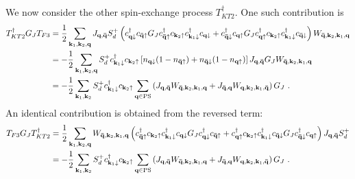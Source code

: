 \documentclass[reprint,hidelinks]{revtex4-2}
\begin{document}
\begin{widetext}
We now consider the other spin-exchange process \(T_{KT2}^\dagger\). One such contribution is
\begin{equation}\begin{aligned}\label{kondoRenorm3}
	T_{KT2}^\dagger G_J T_{F3} &= \frac{1}{2}\sum_{{\bf k}_1,{\bf k}_2,{\bf q}} J_{{\bf q}, {\bf \bar q}}S_d^+ \left(c^\dagger_{{\bf q}\downarrow}c_{{\bf \bar q}\uparrow} G_J c^\dagger_{{\bf \bar q} \uparrow} c_{{\bf k}_2 \uparrow} c^\dagger_{{\bf k}_1 \downarrow} c_{{\bf q} \downarrow} + c^\dagger_{{\bf \bar q}\downarrow}c_{{\bf q}\uparrow}  G_J  c^\dagger_{{\bf q} \uparrow} c_{{\bf k}_2 \uparrow} c^\dagger_{{\bf k}_1 \downarrow} c_{{\bf \bar q} \downarrow}\right)W_{{\bf \bar q}, {\bf k}_2, {\bf k}_1, {\bf q}}\\
							   &= -\frac{1}{2}\sum_{{\bf k}_1,{\bf k}_2,{\bf q}} S_d^+ c^\dagger_{{\bf k}_1 \downarrow} c_{{\bf k}_2 \uparrow}\left[n_{{\bf q}\downarrow}(1 - n_{{\bf \bar q}\uparrow}) + n_{{\bf \bar q}\downarrow}(1 - n_{{\bf q}\uparrow}) \right] J_{{\bf q}, {\bf \bar q}} G_J W_{{\bf \bar q}, {\bf k}_2, {\bf k}_1, {\bf q}}\\
							   &= -\frac{1}{2}\sum_{{\bf k}_1,{\bf k}_2} S_d^+ c^\dagger_{{\bf k}_1 \downarrow} c_{{\bf k}_2 \uparrow}\sum_{{\bf q} \in \text{PS}}\left(J_{{\bf q}, {\bf \bar q}} W_{{\bf \bar q}, {\bf k}_2, {\bf k}_1, {\bf q}} + J_{{\bf \bar q}, {\bf q}} W_{{\bf q}, {\bf k}_2, {\bf k}_1, {\bf \bar q}}\right)G_J~.
\end{aligned}\end{equation}
An identical contribution is obtained from the reversed term:
\begin{equation}\begin{aligned}\label{kondoRenorm4}
	T_{F3}G_J T_{KT2}^\dagger  &= \frac{1}{2}\sum_{{\bf k}_1,{\bf k}_2,{\bf q}} W_{{\bf \bar q}, {\bf k}_2, {\bf k}_1, {\bf q}}\left(c^\dagger_{{\bf \bar q} \uparrow} c_{{\bf k}_2 \uparrow} c^\dagger_{{\bf k}_1 \downarrow} c_{{\bf q} \downarrow} G_J c^\dagger_{{\bf q}\downarrow}c_{{\bf \bar q}\uparrow} +  c^\dagger_{{\bf q} \uparrow} c_{{\bf k}_2 \uparrow} c^\dagger_{{\bf k}_1 \downarrow} c_{{\bf \bar q} \downarrow} G_J c^\dagger_{{\bf \bar q}\downarrow}c_{{\bf q}\uparrow} \right)J_{{\bf q}, {\bf \bar q}}S_d^+ \\
							   &= -\frac{1}{2}\sum_{{\bf k}_1,{\bf k}_2} S_d^+ c^\dagger_{{\bf k}_1 \downarrow} c_{{\bf k}_2 \uparrow}\sum_{{\bf q} \in \text{PS}}\left(J_{{\bf q}, {\bf \bar q}} W_{{\bf \bar q}, {\bf k}_2, {\bf k}_1, {\bf q}} + J_{{\bf \bar q}, {\bf q}} W_{{\bf q}, {\bf k}_2, {\bf k}_1, {\bf \bar q}}\right)G_J~.
\end{aligned}\end{equation}


\end{widetext}
\end{document}
